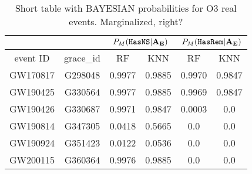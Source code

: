 \begin{table}[]
\begin{tabular}{c|c|cc|cc}
\hline
\multicolumn{1}{c|}{}         & \multicolumn{1}{l|}{} & \multicolumn{2}{c|}{$P_M({{\tt HasNS}}|{\bf A}_{\bf E})$}                                                & \multicolumn{2}{c}{$P_M({{\tt HasRem}}|{\bf A}_{\bf E})$}                                                \\ \hline
\multicolumn{1}{c|}{event ID} & grace\_id             & \multicolumn{1}{c}{RF} & \multicolumn{1}{c}{KNN}  & \multicolumn{1}{c}{RF} & \multicolumn{1}{c}{KNN} \\ \hline
GW170817                      & G298048               & 0.9977                   & 0.9885                    & 0.9970                   & 0.9847                                  \\
GW190425                      & G330564               & 0.9977                   & 0.9885                    & 0.9969                   & 0.9847                             \\
GW190426                      & G330687               & 0.9971                   & 0.9847                    & 0.0003                   & 0.0                     \\
GW190814                      & G347305               & 0.0418                   & 0.5665                   & 0.0                  & 0.0                      \\
GW190924                      & G351423               & 0.0122                   & 0.0536                   & 0.0                   & 0.0                       \\               
GW200115                      & G360364               & 0.9976                   & 0.9885                   & 0.0                  & 0.0                           \\
\hline
\end{tabular}
\caption{Short table with BAYESIAN probabilities for O3 real events. Marginalized, right? }
\label{tab:real_data_bayesian}
\end{table}

